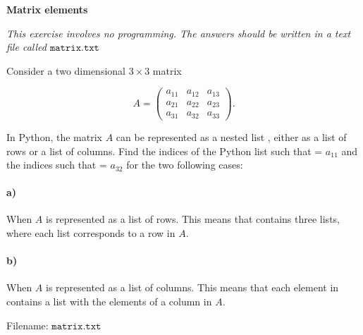 \begin{Problem}{\textbf{Matrix elements}}

\begin{center}
\emph{This exercise involves no programming. \newline The answers should be written in a text file called $\texttt{matrix.txt}$}    
\end{center}

\noindent Consider a two dimensional $3 \times 3$ matrix 

\begin{equation*}
   A = \begin{pmatrix} 
        a_{1 1} & a_{1 2} & a_{1 3} \\
        a_{2 1} & a_{2 2} & a_{2 3} \\
        a_{3 1} & a_{3 2} & a_{3 3} 
    \end{pmatrix} .
\end{equation*}

In Python, the matrix $A$ can be represented as a nested list , either as a list of rows or a list of columns. Find the indices  of the Python list  such that  = $a_{1 1}$ and the indices   such that  = $a_{3 2}$ for the two following cases:

\paragraph{a)}
When $A$ is represented as a list of rows. This means that  contains three lists, where each list corresponds to a row in $A$.

\paragraph{b)}
When $A$ is represented as a list of columns. This means that each element in  contains a list with the elements of a column in $A$.

    
Filename: $\texttt{matrix.txt}$
\end{Problem}